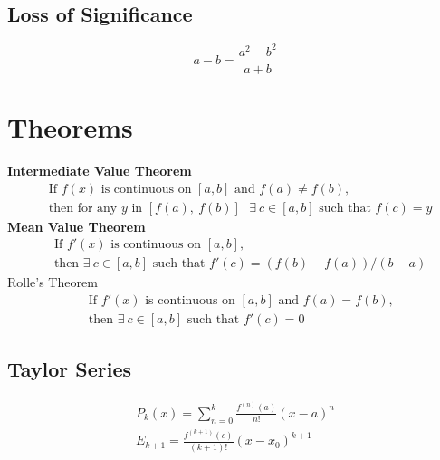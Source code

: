 \documentclass[10pt]{article}
\begin{document}
\begin{multicols}{2}
\begin{minipage}{\columnwidth}
        \subsection*{Loss of Significance}
        \begin{equation*}
            a - b = \frac{a^2-b^2}{a+b}
        \end{equation*}
        \section*{Theorems}
        \textbf{Intermediate Value Theorem}
        \begin{equation*}
            \begin{aligned}
                & \text{If } f(x) \text{ is continuous on } [a,b] \text{ and } f(a) \neq f(b) \text{,} \\
                & \text{then for any \(y\) in \([f(a),\ f(b)] \) } \exists\ c \in [a,b] \text{ such that } f(c) = y
            \end{aligned}
        \end{equation*}
        \textbf{Mean Value Theorem}
        \begin{equation*}
            \begin{aligned}
                & \text{If } f'(x) \text{ is continuous on } [a,b] \text{,} \\
                & \text{then } \exists\ c \in [a,b] \text{ such that } f'(c) = (f(b)-f(a))/(b-a)
            \end{aligned}
        \end{equation*}
        Rolle's Theorem
        \begin{equation*}
            \begin{aligned}
                & \text{If } f'(x) \text{ is continuous on } [a,b] \text{ and } f(a) = f(b) \text{,} \\
                & \text{then } \exists\ c \in [a,b] \text{ such that } f'(c) = 0
            \end{aligned}
        \end{equation*}
        \subsection*{Taylor Series}
        \begin{align*}
            P_k(x) = \sum_{n=0}^k \frac{f^{(n)}(a)}{n!} (x-a)^n \\
            E_{k+1} = \frac{f^{(k+1)}(c)}{(k + 1)!}  (x-x_0) ^ {k+1}
        \end{align*}
    \end{minipage}
    \begin{minipage}{\columnwidth}
        \begin{flushright}

\end{flushright}
\end{minipage}
\end{multicols}
\end{document}
